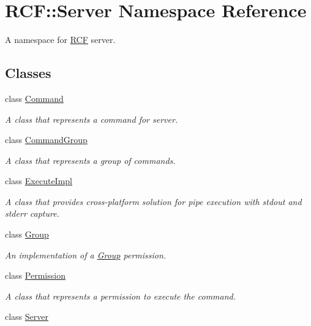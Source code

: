 \hypertarget{namespace_r_c_f_1_1_server}{}\section{R\+C\+F\+:\+:Server Namespace Reference}
\label{namespace_r_c_f_1_1_server}


A namespace for \hyperlink{namespace_r_c_f}{R\+C\+F} server.  


\subsection*{Classes}
\begin{DoxyCompactItemize}
\item 
class \hyperlink{class_r_c_f_1_1_server_1_1_command}{Command}
\begin{DoxyCompactList}\small\item\em A class that represents a command for server. \end{DoxyCompactList}\item 
class \hyperlink{class_r_c_f_1_1_server_1_1_command_group}{Command\+Group}
\begin{DoxyCompactList}\small\item\em A class that represents a group of commands. \end{DoxyCompactList}\item 
class \hyperlink{class_r_c_f_1_1_server_1_1_execute_impl}{Execute\+Impl}
\begin{DoxyCompactList}\small\item\em A class that provides cross-\/platform solution for pipe execution with stdout and stderr capture. \end{DoxyCompactList}\item 
class \hyperlink{class_r_c_f_1_1_server_1_1_group}{Group}
\begin{DoxyCompactList}\small\item\em An implementation of a \hyperlink{class_r_c_f_1_1_server_1_1_group}{Group} permission. \end{DoxyCompactList}\item 
class \hyperlink{class_r_c_f_1_1_server_1_1_permission}{Permission}
\begin{DoxyCompactList}\small\item\em A class that represents a permission to execute the command. \end{DoxyCompactList}\item 
class \hyperlink{class_r_c_f_1_1_server_1_1_server}{Server}

\end{DoxyCompactItemize}
